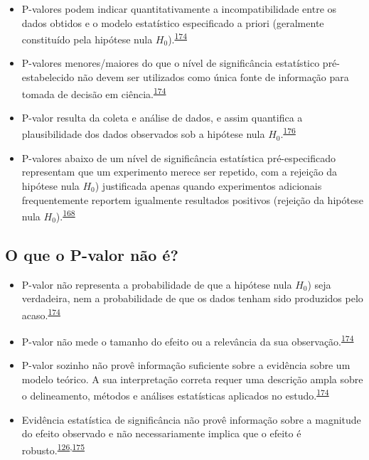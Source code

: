 \documentclass[
  a4paper,
]{book}
\begin{document}
\begin{itemize}
\item
  P-valores podem indicar quantitativamente a incompatibilidade entre os dados obtidos e o modelo estatístico especificado a priori (geralmente constituído pela hipótese nula \(H_{0}\)).\textsuperscript{\protect\hyperlink{ref-wasserstein2016}{174}}
\item
  P-valores menores/maiores do que o nível de significância estatístico pré-estabelecido não devem ser utilizados como única fonte de informação para tomada de decisão em ciência.\textsuperscript{\protect\hyperlink{ref-wasserstein2016}{174}}
\item
  P-valor resulta da coleta e análise de dados, e assim quantifica a plausibilidade dos dados observados sob a hipótese nula \(H_{0}\).\textsuperscript{\protect\hyperlink{ref-heinze2016}{176}}
\item
  P-valores abaixo de um nível de significância estatística pré-especificado representam que um experimento merece ser repetido, com a rejeição da hipótese nula \(H_{0}\)) justificada apenas quando experimentos adicionais frequentemente reportem igualmente resultados positivos (rejeição da hipótese nula \(H_{0}\)).\textsuperscript{\protect\hyperlink{ref-goodman2016}{168}}
\end{itemize}

\hypertarget{o-que-o-p-valor-nuxe3o-uxe9}{%
\subsection{O que o P-valor não é?}\label{o-que-o-p-valor-nuxe3o-uxe9}}

\begin{itemize}
\item
  P-valor não representa a probabilidade de que a hipótese nula \(H_{0}\)) seja verdadeira, nem a probabilidade de que os dados tenham sido produzidos pelo acaso.\textsuperscript{\protect\hyperlink{ref-wasserstein2016}{174}}
\item
  P-valor não mede o tamanho do efeito ou a relevância da sua observação.\textsuperscript{\protect\hyperlink{ref-wasserstein2016}{174}}
\item
  P-valor sozinho não provê informação suficiente sobre a evidência sobre um modelo teórico. A sua interpretação correta requer uma descrição ampla sobre o delineamento, métodos e análises estatísticas aplicados no estudo.\textsuperscript{\protect\hyperlink{ref-wasserstein2016}{174}}
\item
  Evidência estatística de significância não provê informação sobre a magnitude do efeito observado e não necessariamente implica que o efeito é robusto.\textsuperscript{\protect\hyperlink{ref-Landis2012}{126},\protect\hyperlink{ref-altman2017}{175}}
\end{itemize}
\end{document}
